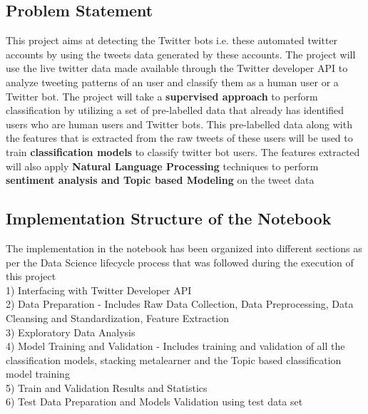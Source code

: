 \documentclass[11pt]{article}
\begin{document}
\subsection{Problem Statement}\label{problem-statement}

This project aims at detecting the Twitter bots i.e. these automated
twitter accounts by using the tweets data generated by these accounts.
The project will use the live twitter data made available through the
Twitter developer API to analyze tweeting patterns of an user and
classify them as a human user or a Twitter bot. The project will take a
\textbf{supervised approach} to perform classification by utilizing a
set of pre-labelled data that already has identified users who are human
users and Twitter bots. This pre-labelled data along with the features
that is extracted from the raw tweets of these users will be used to
train \textbf{classification models} to classify twitter bot users. The
features extracted will also apply \textbf{Natural Language Processing}
techniques to perform \textbf{sentiment analysis and Topic based
Modeling} on the tweet data

\subsection{Implementation Structure of the
Notebook}\label{implementation-structure-of-the-notebook}

The implementation in the notebook has been organized into different
sections as per the Data Science lifecycle process that was followed
during the execution of this project\\
1) Interfacing with Twitter Developer API\\
2) Data Preparation - Includes Raw Data Collection, Data Preprocessing,
Data Cleansing and Standardization, Feature Extraction\\
3) Exploratory Data Analysis\\
4) Model Training and Validation - Includes training and validation of
all the classification models, stacking metalearner and the Topic based
classification model training\\
5) Train and Validation Results and Statistics\\
6) Test Data Preparation and Models Validation using test data set
\end{document}
